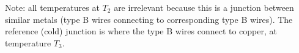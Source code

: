 Note: all temperatures at $T_2$ are irrelevant because this is a junction between similar metals (type B wires connecting to corresponding type B wires).  The reference (cold) junction is where the type B wires connect to copper, at temperature $T_3$.










